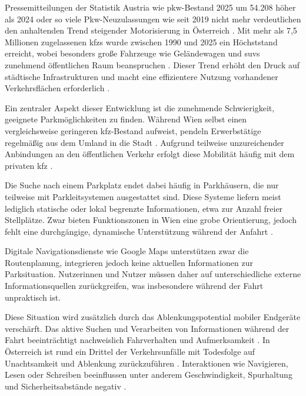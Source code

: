 Pressemitteilungen der Statistik Austria wie \glqq \acs{pkw}-Bestand 2025 um 54.208 höher als 2024\grqq{} oder  so viele Pkw-Neuzulassungen wie seit 2019 nicht mehr\grqq{} verdeutlichen den anhaltenden Trend steigender Motorisierung in Österreich \parencites[S. 1]{statistikaustriaPkwBestand2025Um2026}[S. 1]{statistikaustria2025VielePkwNeuzulassungen2026}. 
Mit mehr als 7,5 Millionen zugelassenen \acp{kfz} wurde zwischen 1990 und 2025 ein Höchststand erreicht, wobei besonders große Fahrzeuge wie Geländewagen und \acp{suv} zunehmend öffentlichen Raum beanspruchen \parencite{hatzlDatenZeigenImmer2025}. 
Dieser Trend erhöht den Druck auf städtische Infrastrukturen und macht eine effizientere Nutzung vorhandener Verkehrsflächen erforderlich \parencite{jaschinskyWarumOsterreichsStadte2025}. 

Ein zentraler Aspekt dieser Entwicklung ist die zunehmende Schwierigkeit, geeignete Parkmöglichkeiten zu finden. 
Während Wien selbst einen vergleichsweise geringeren \acs{kfz}-Bestand aufweist, pendeln Erwerbstätige regelmäßig aus dem Umland in die Stadt \parencite{statistikaustriaKfzBestand2026}. 
Aufgrund teilweise unzureichender Anbindungen an den öffentlichen Verkehr erfolgt diese Mobilität häufig mit dem privaten \acs{kfz} \parencite{aknoAKNiederosterreichPendleranalyse20252025}. 

Die Suche nach einem Parkplatz endet dabei häufig in Parkhäusern, die nur teilweise mit Parkleitsystemen ausgestattet sind. 
Diese Systeme liefern meist lediglich statische oder lokal begrenzte Informationen, etwa zur Anzahl freier Stellplätze. 
Zwar bieten Funktionszonen in Wien eine grobe Orientierung, jedoch fehlt eine durchgängige, dynamische Unterstützung während der Anfahrt \parencite{stadtwienParkleitsystemFuerWien2026}. 

Digitale Navigationsdienste wie Google Maps unterstützen zwar die Routenplanung, integrieren jedoch keine aktuellen Informationen zur Parksituation. 
Nutzerinnen und Nutzer müssen daher auf unterschiedliche externe Informationsquellen zurückgreifen, was insbesondere während der Fahrt unpraktisch ist. 

Diese Situation wird zusätzlich durch das Ablenkungspotential mobiler Endgeräte verschärft. 
Das aktive Suchen und Verarbeiten von Informationen während der Fahrt beeinträchtigt nachweislich Fahrverhalten und Aufmerksamkeit \parencite[S. 361]{oviedo-trespalaciosUnderstandingImpactsMobile2016}. 
In Österreich ist rund ein Drittel der Verkehrsunfälle mit Todesfolge auf Unachtsamkeit und Ablenkung zurückzuführen \parencite{bmi397VerkehrstoteAuf2026}. 
Interaktionen wie Navigieren, Lesen oder Schreiben beeinflussen unter anderem Geschwindigkeit, Spurhaltung und Sicherheitsabstände negativ \parencite[S. 372-373]{oviedo-trespalaciosUnderstandingImpactsMobile2016}. 

